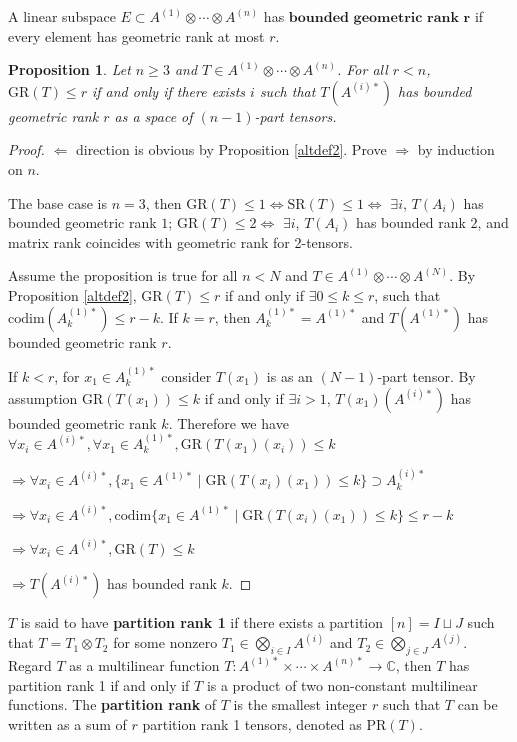 \documentclass[10pt]{article} %
\newtheorem{prop}[thm]{Proposition}
\theoremstyle{definition}
\begin{document}
A linear subspace $E\subset A^{(1)}\otimes\cdots\otimes A^{(n)}$ has $\textbf{bounded geometric rank r}$ if every element has geometric rank at most $r$. 

\begin{prop}\label{prop:npart2}
Let $n\geq 3$ and $T\in A^{(1)}\otimes\cdots\otimes A^{(n)}$. For all $r< n$, $\mathrm{GR}(T)\leq r$ if and only if there exists $i$ such that $T(A^{(i)*})$ has bounded geometric rank $r$ as a space of $(n-1)$-part tensors.
\end{prop}

\begin{proof}
$\Leftarrow$ direction is obvious by Proposition \ref{altdef2}. Prove $\Rightarrow$ by induction on $n$.

The base case is $n=3$, then $\mathrm{GR}(T)\leq 1\iff\mathrm{SR}(T)\leq 1 \iff$ $\exists i$, $T(A_i)$ has bounded geometric rank $1$; $\mathrm{GR}(T)\leq 2\iff$ $\exists i$, $T(A_i)$ has bounded rank $2$, and matrix rank coincides with geometric rank for 2-tensors.

Assume the proposition is true for all $n<N$ and $T\in A^{(1)}\otimes\cdots\otimes A^{(N)}$. By Proposition \ref{altdef2}, $\mathrm{GR}(T)\leq r$ if and only if $\exists 0\leq k\leq r$, such that $\mathrm{codim}(A^{(1)*}_k)\leq r-k$. If $k=r$, then $A^{(1)*}_k=A^{(1)*}$ and $T(A^{(1)*})$ has bounded geometric rank $r$. 

If $k<r$, for $x_1\in A^{(1)*}_k$ consider $T(x_1)$ is as an $(N-1)$-part tensor. By assumption $\mathrm{GR}(T(x_1))\leq k$ if and only if $\exists i>1$, $T(x_1)(A^{(i)*})$ has bounded geometric rank $k$. Therefore we have 
$\forall x_i\in A^{(i)*},\forall x_1\in A^{(1)*}_k,\mathrm{GR}(T(x_1)(x_i))\leq k$

$\Rightarrow \forall x_i\in A^{(i)*},\{x_1\in A^{(1)*}\mid \mathrm{GR}(T(x_i)(x_1))\leq k\}\supset A^{(i)*}_k$

$\Rightarrow \forall x_i\in A^{(i)*},\mathrm{codim}\{x_1\in A^{(1)*}\mid \mathrm{GR}(T(x_i)(x_1))\leq k\}\leq r-k$

$\Rightarrow \forall x_i\in A^{(i)*},\mathrm{GR}(T)\leq k$

$\Rightarrow T(A^{(i)*})$ has bounded rank $k$.
\end{proof}

$T$ is said to have \textbf{partition rank 1} if there exists a partition $[n]=I\sqcup J$ such that $T=T_1\otimes T_2$ for some nonzero $T_1\in \bigotimes_{i\in I}A^{(i)}$ and $T_2\in\bigotimes_{j\in J}A^{(j)}$. Regard $T$ as a multilinear function $T: A^{(1)*}\times\cdots\times A^{(n)*}\rightarrow \mathbb{C}$, then $T$ has partition rank 1 if and only if $T$ is a product of two non-constant multilinear functions. The \textbf{partition rank} of $T$ is the smallest integer $r$ such that $T$ can be written as a sum of $r$ partition rank 1 tensors, denoted as $\mathrm{PR}(T)$. 
\end{document}

